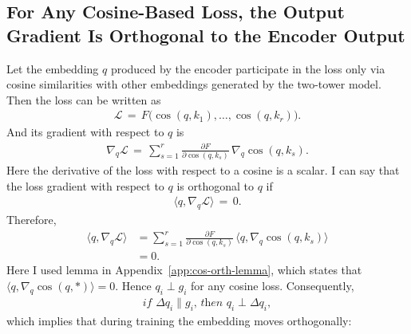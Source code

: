 \subsection{For Any Cosine-Based Loss, the Output Gradient Is Orthogonal to the Encoder Output}

Let the embedding $q$ produced by the encoder participate in the loss only via cosine similarities with other embeddings generated by the two-tower model. Then the loss can be written as
\begin{align}
\mathcal L \,=\, F\bigl(\cos(q,k_1),\dots,\cos(q,k_r)\bigr).
\end{align}
And its gradient with respect to $q$ is
\begin{align}
\nabla_q\mathcal L \,=\, \sum_{s=1}^{r} \frac{\partial F}{\partial \cos(q,k_s)}\, \nabla_q \cos(q,k_s). \label{eq:grad-cos-loss}
\end{align}
Here the derivative of the loss with respect to a cosine is a scalar. I can say that the loss gradient with respect to $q$ is orthogonal to $q$ if
\begin{align}
\langle q,\nabla_q\mathcal L \rangle \,=\, 0.
\end{align}
Therefore,
\begin{equation}
\begin{aligned}
\langle q,\nabla_q\mathcal L \rangle 
&= \sum_{s=1}^{r} \frac{\partial F}{\partial \cos(q,k_s)}\, \langle q,\nabla_q \cos(q,k_s) \rangle \\
&= 0.
\end{aligned}
\end{equation}
Here I used lemma in Appendix~\ref{app:cos-orth-lemma}, which states that $\langle q, \nabla_q \cos(q,\ast) \rangle = 0$.
Hence $q_i \perp g_i$ for any cosine loss. Consequently, 
\begin{equation}
\begin{aligned}
\textit{if } \Delta q_i \parallel g_i \textit{, then } q_i \perp \Delta q_i, \label{eq:ort-move-proof}
\end{aligned}
\end{equation}
which implies that during training the embedding moves orthogonally:

